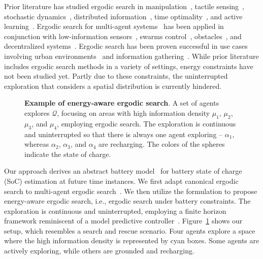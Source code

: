 \documentclass[letterpaper,10pt,conference,twoside]{IEEEtran}
\theoremstyle{definition}
\begin{document}
Prior literature has studied ergodic search in manipulation~\cite{shetty2022ergodic}, tactile sensing~\cite{abraham2017ergodic}, stochastic dynamics~\cite{ayvali2017ergodic,torre2016ergodic}, distributed information~\cite{miller2016ergodic}, time optimality~\cite{dong2023time}, and active learning~\cite{abraham2021ergodic}. Ergodic search for multi-agent systems~\cite{prabhakar2020ergodic,coffin2022multi} has been applied in conjunction with low-information sensors~\cite{coffin2022multi,lerch2023safety,abraham2018decentralized}, swarms control~\cite{prabhakar2020ergodic}, obstacles~\cite{lerch2023safety}, and decentralized systems~\cite{abraham2018decentralized}. Ergodic search has been proven successful in use cases involving urban environments~\cite{patel2021multi} and information gathering~\cite{dressel2018optimality}.
While prior literature includes ergodic search methods in a variety of settings, energy constraints have not been studied yet. 
Partly due to these constraints, the uninterrupted exploration %
that %
considers a spatial distribution is currently hindered. 

\begin{figure}[t!]
  \centering
  \vspace*{-.1cm}
  \caption{\textbf{Example of energy-aware ergodic search}. A set of agents explores $\mathcal{Q}$, focusing on areas with high information density $\mu_1$, $\mu_2$, $\mu_3$, and $\mu_4$, employing ergodic search. The exploration is continuous and uninterrupted %
  so that there is always one agent exploring -- $\alpha_1$, whereas $\alpha_2$, $\alpha_3$, and $\alpha_4$ are recharging. The colors of the spheres indicate the state of charge.}
  \label{fig:abs}
  \vspace*{-0cm}
\end{figure}

Our approach derives an abstract battery model~\cite{zhao2017observability} for battery state of charge (SoC) estimation at future time instances. We first adapt canonical ergodic search to multi-agent ergodic search~\cite{prabhakar2020ergodic,coffin2022multi}. We then utilize the formulation to propose energy-aware ergodic search, i.e., ergodic search under battery constraints. The exploration is continuous and uninterrupted, employing a finite horizon framework reminiscent of a model predictive controller~\cite{seewald2022energy}. %
Figure~\ref{fig:abs} shows our setup, which resembles a search and rescue scenario. Four agents explore a space where the high information density is represented by cyan boxes. Some agents are actively exploring, while others are grounded and recharging.
\end{document}
